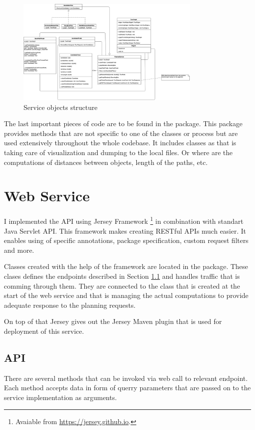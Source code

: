 \documentclass{ctuthesis}
\begin{document}
\begin{figure}
	\includegraphics[width=0.8\textwidth]{service.png}
	\caption{Service objects structure}
	\label{fig:coreService}
\end{figure}

The last important pieces of code are to be found in the  package. This package provides methods that are not specific to one of the classes or process but are used extensively throughout the whole codebase. It includes classes as  that is taking care of visualization and dumping to the local files. Or  where are the computations of distances between objects, length of the paths, etc.



\section{Web Service} \label{sec:service}
I implemented the API using Jersey Framework \footnote{Avaiable from \url{https://jersey.github.io}.} in combination with standart Java Servlet API. This framework makes creating RESTful APIs\cite{rest} much easier. It enables using of specific annotations, package specification, custom request filters and more. \par
Classes created with the help of the framework are located in the  package. These clases defines the endpoints described in Section \ref{sec:api} and handles traffic that is comming through them. They are connected to the  class that is created at the start of the web service and that is managing the actual computations to provide adequate response to the planning requests. \par
On top of that Jersey gives out the Jersey Maven plugin that is used for deployment of this service. 

\subsection{API} \label{sec:api}
There are several methods that can be invoked via web call to relevant endpoint. Each method accepts data in form of querry parameters that are passed on to the service implementation as arguments.
\end{document}

